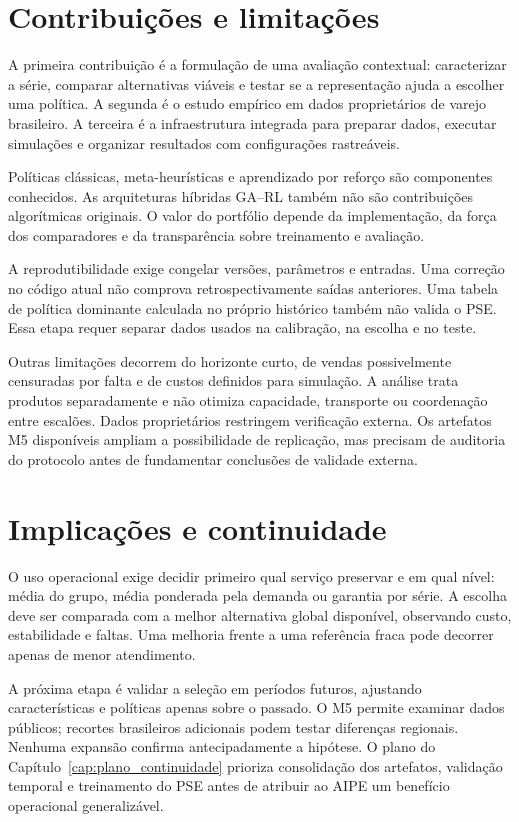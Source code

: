 \section{Contribuições e limitações}

A primeira contribuição é a formulação de uma avaliação contextual: caracterizar a série, comparar alternativas viáveis e testar se a representação ajuda a escolher uma política. A segunda é o estudo empírico em dados proprietários de varejo brasileiro. A terceira é a infraestrutura integrada para preparar dados, executar simulações e organizar resultados com configurações rastreáveis.

Políticas clássicas, meta-heurísticas e aprendizado por reforço são componentes conhecidos. As arquiteturas híbridas GA--RL também não são contribuições algorítmicas originais. O valor do portfólio depende da implementação, da força dos comparadores e da transparência sobre treinamento e avaliação.

A reprodutibilidade exige congelar versões, parâmetros e entradas. Uma correção no código atual não comprova retrospectivamente saídas anteriores. Uma tabela de política dominante calculada no próprio histórico também não valida o PSE. Essa etapa requer separar dados usados na calibração, na escolha e no teste.

Outras limitações decorrem do horizonte curto, de vendas possivelmente censuradas por falta e de custos definidos para simulação. A análise trata produtos separadamente e não otimiza capacidade, transporte ou coordenação entre escalões. Dados proprietários restringem verificação externa. Os artefatos M5 disponíveis ampliam a possibilidade de replicação, mas precisam de auditoria do protocolo antes de fundamentar conclusões de validade externa.

\section{Implicações e continuidade}

O uso operacional exige decidir primeiro qual serviço preservar e em qual nível: média do grupo, média ponderada pela demanda ou garantia por série. A escolha deve ser comparada com a melhor alternativa global disponível, observando custo, estabilidade e faltas. Uma melhoria frente a uma referência fraca pode decorrer apenas de menor atendimento.

A próxima etapa é validar a seleção em períodos futuros, ajustando características e políticas apenas sobre o passado. O M5 permite examinar dados públicos; recortes brasileiros adicionais podem testar diferenças regionais. Nenhuma expansão confirma antecipadamente a hipótese. O plano do Capítulo~\ref{cap:plano_continuidade} prioriza consolidação dos artefatos, validação temporal e treinamento do PSE antes de atribuir ao AIPE um benefício operacional generalizável.

